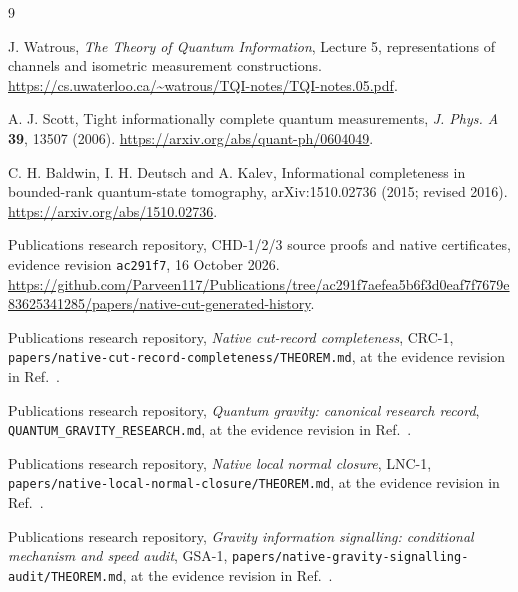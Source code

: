 \documentclass[11pt,a4paper]{article}
\begin{document}
\begin{thebibliography}{9}
\raggedright
{}
J. Watrous, \emph{The Theory of Quantum Information}, Lecture 5,
representations of channels and isometric measurement constructions.
\url{https://cs.uwaterloo.ca/~watrous/TQI-notes/TQI-notes.05.pdf}.

A. J. Scott, Tight informationally complete quantum measurements,
\emph{J. Phys. A} \textbf{39}, 13507 (2006).
\url{https://arxiv.org/abs/quant-ph/0604049}.

C. H. Baldwin, I. H. Deutsch and A. Kalev,
Informational completeness in bounded-rank quantum-state tomography,
arXiv:1510.02736 (2015; revised 2016).
\url{https://arxiv.org/abs/1510.02736}.

Publications research repository, CHD-1/2/3 source proofs and native
certificates, evidence revision \texttt{ac291f7}, 16 October 2026.
\url{https://github.com/Parveen117/Publications/tree/ac291f7aefea5b6f3d0eaf7f7679e83625341285/papers/native-cut-generated-history}.

Publications research repository, \emph{Native cut-record completeness},
CRC-1, \texttt{papers/native-cut-record-completeness/THEOREM.md},
at the evidence revision in Ref.~\cite{chd}.

Publications research repository, \emph{Quantum gravity: canonical research
record}, \texttt{QUANTUM\_GRAVITY\_RESEARCH.md},
at the evidence revision in Ref.~\cite{chd}.

Publications research repository, \emph{Native local normal closure},
LNC-1, \texttt{papers/native-local-normal-closure/THEOREM.md},
at the evidence revision in Ref.~\cite{chd}.

Publications research repository, \emph{Gravity information signalling:
conditional mechanism and speed audit}, GSA-1,
\texttt{papers/native-gravity-signalling-audit/THEOREM.md},
at the evidence revision in Ref.~\cite{chd}.
\end{thebibliography}
\end{document}
